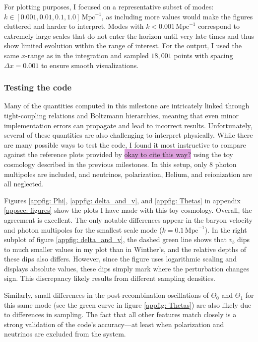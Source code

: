 \documentclass{aa}
\numberwithin{equation}{section}
\numberwithin{table}{section}
\numberwithin{figure}{section}
\begin{document}
For plotting purposes, I focused on a representative subset of modes: $k \in [0.001, 0.01, 0.1, 1.0]\,\text{Mpc}^{-1}$, as including more values would make the figures cluttered and harder to interpret. Modes with $k < 0.001\,\text{Mpc}^{-1}$ correspond to extremely large scales that do not enter the horizon until very late times and thus show limited evolution within the range of interest. For the output, I used the same $x$-range as in the integration and sampled $18,001$ points with spacing $\Delta x = 0.001$ to ensure smooth visualizations.



\subsubsection{Testing the code}
Many of the quantities computed in this milestone are intricately linked through tight-coupling relations and Boltzmann hierarchies, meaning that even minor implementation errors can propagate and lead to incorrect results. Unfortunately, several of these quantities are also challenging to interpret physically. While there are many possible ways to test the code, I found it most instructive to compare against the reference plots provided by \cite{Course} \colorbox{Plum}{okay to cite this way?}  using the toy cosmology described in the previous milestones. In this setup, only 8 photon multipoles are included, and neutrinos, polarization, Helium, and reionization are all neglected.

Figures \ref{appfig: Phi}, \ref{appfig: delta_and_v}, and \ref{appfig: Thetas} in appendix \ref{appsec: figures} show the plots I have made with this toy cosmology. Overall, the agreement is excellent. The only notable differences appear in the baryon velocity and photon multipoles for the smallest scale mode ($k=0.1\,\text{Mpc}^{-1}$). In the right subplot of figure \ref{appfig: delta_and_v}, the dashed green line shows that $v_b$ dips to much smaller values in my plot than in Winther's, and the relative depths of these dips also differs. However, since the figure uses logarithmic scaling and displays absolute values, these dips simply mark where the perturbation changes sign. This discrepancy likely results from different sampling densities.

Similarly, small differences in the post-recombination oscillations of $\Theta_0$ and $\Theta_1$ for this same mode (see the green curve in figure \ref{appfig: Thetas}) are also likely due to differences in sampling. The fact that all other features match closely is a strong validation of the code's accuracy—at least when polarization and neutrinos are excluded from the system.
\end{document}
